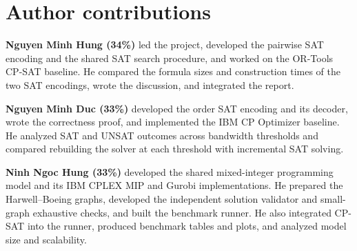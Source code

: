 \documentclass[a4paper,fleqn]{cas-sc}
\begin{document}
\section*{Author contributions}

\textbf{Nguyen Minh Hung (34\%)} led the project, developed the pairwise SAT
encoding and the shared SAT search procedure, and worked on the OR-Tools
CP-SAT baseline. He compared the formula sizes and construction times of
the two SAT encodings, wrote the discussion, and integrated the report.

\textbf{Nguyen Minh Duc (33\%)} developed the order SAT encoding and its
decoder, wrote the correctness proof, and implemented the IBM CP Optimizer
baseline. He analyzed SAT and UNSAT outcomes across bandwidth thresholds
and compared rebuilding the solver at each threshold with incremental SAT
solving.

\textbf{Ninh Ngoc Hung (33\%)} developed the shared mixed-integer programming
model and its IBM CPLEX MIP and Gurobi implementations. He prepared the
Harwell--Boeing graphs, developed the independent solution validator and
small-graph exhaustive checks, and built the benchmark runner. He also
integrated CP-SAT into the runner, produced benchmark tables and plots,
and analyzed model size and scalability.
\end{document}
